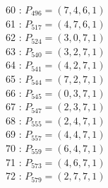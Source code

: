\documentclass{article}
\begin{document}
{\begin{multicols}{3}
60 : $P_{496}=( 7, 4, 6, 1 )$\\
61 : $P_{517}=( 4, 7, 6, 1 )$\\
62 : $P_{524}=( 3, 0, 7, 1 )$\\
63 : $P_{540}=( 3, 2, 7, 1 )$\\
64 : $P_{541}=( 4, 2, 7, 1 )$\\
65 : $P_{544}=( 7, 2, 7, 1 )$\\
66 : $P_{545}=( 0, 3, 7, 1 )$\\
67 : $P_{547}=( 2, 3, 7, 1 )$\\
68 : $P_{555}=( 2, 4, 7, 1 )$\\
69 : $P_{557}=( 4, 4, 7, 1 )$\\
70 : $P_{559}=( 6, 4, 7, 1 )$\\
71 : $P_{573}=( 4, 6, 7, 1 )$\\
72 : $P_{579}=( 2, 7, 7, 1 )$\\
\end{multicols}


%


%


}%
\end{document}

